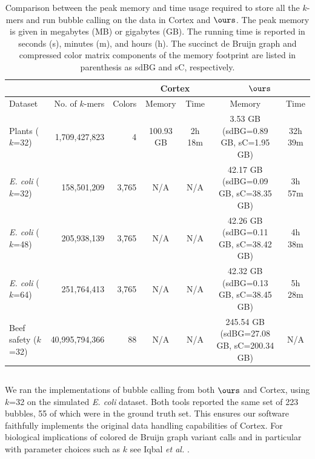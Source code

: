 \documentclass[doctor]{thesis}
\begin{document}
\begin{table}  \small
  \centering
  \begin{tabular}{| l | r | r | c | c | c |c |}
   	\hline
	\multicolumn{1}{|l}{}
   	& \multicolumn{1}{r}{}	
	& \multicolumn{1}{r}{} 
	& \multicolumn{2}{|c|}{{\sc Cortex}} 
	& \multicolumn{2}{|c|}{$\ours$}  \\
	\hline
	 Dataset & No. of $k$-mers & Colors & Memory & Time & Memory & Time \\
	\hline
	Plants	($k$=32)				& 1,709,427,823 	& 4 	& 100.93 GB 	& 2h 18m	& 3.53 GB (sdBG=0.89 GB, sC=1.95 GB) 	& 32h 39m \\
     \emph{E. coli}  ($k$=32)         & 158,501,209       & 3,765 & N/A        & N/A      &  42.17 GB (sdBG=0.09 GB, sC=38.35 GB)     & 3h 57m  \\
     \emph{E. coli}  ($k$=48)         & 205,938,139       & 3,765 & N/A        & N/A      &  42.26 GB (sdBG=0.11 GB, sC=38.42 GB)     & 4h 38m  \\
     \emph{E. coli}  ($k$=64)         & 251,764,413       & 3,765 & N/A        & N/A      &  42.32 GB (sdBG=0.13 GB, sC=38.45 GB)     & 5h 28m  \\
    Beef safety ($k$=32)                            & 40,995,794,366    & 88    & N/A        & N/A   & 245.54 GB (sdBG=27.08 GB, sC=200.34 GB)     & N/A \\
 	\hline
	\end{tabular}
  \caption{Comparison between the peak memory and time usage required to store all the $k$-mers and run bubble calling on the data in {\sc Cortex} and $\ours$.
        The peak memory is given in megabytes (MB) or gigabytes (GB). The running time is reported in seconds (s), minutes (m), and hours (h).  The succinct de Bruijn graph and compressed color matrix components of the memory footprint are listed in parenthesis as sdBG and sC, respectively.}
 \label{tbl-cosmo}
\end{table}


\subsection{}

We ran the implementations of bubble calling from both $\ours$ and {\sc Cortex}, using $k$=32 on the simulated \emph{E. coli} dataset.  Both tools reported the same set of 223 bubbles, 55 of which were in the ground truth set.  This ensures our software faithfully implements the original data handling capabilities of {\sc Cortex}.  For biological implications of colored de Bruijn graph variant calls and in particular with parameter choices such as $k$ see Iqbal {\it et al.} \citep{ICTFM12}.
\end{document}
